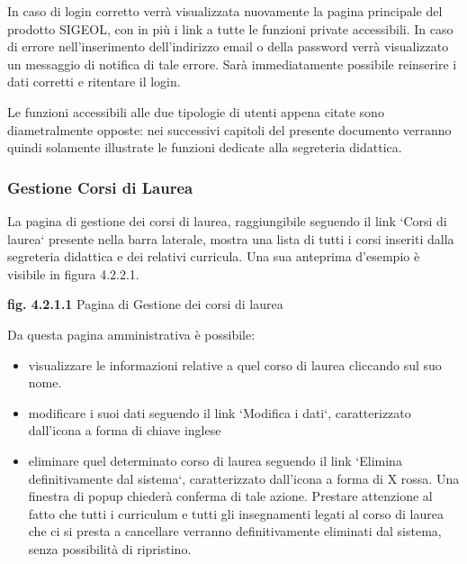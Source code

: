 \documentclass[11pt,a4paper]{article}
\begin{document}
In caso di login corretto verrà visualizzata nuovamente la pagina principale del prodotto SIGEOL, con in più i link a tutte le funzioni private accessibili.
In caso di errore nell'inserimento dell'indirizzo email o della password verrà visualizzato un messaggio di notifica di tale errore.
Sarà immediatamente possibile reinserire i dati corretti e ritentare il login.

Le funzioni accessibili alle due tipologie di utenti appena citate sono diametralmente opposte: nei successivi capitoli del presente documento verranno quindi solamente illustrate le funzioni dedicate alla segreteria didattica.
\subsubsection{Gestione Corsi di Laurea}
La pagina di gestione dei corsi di laurea, raggiungibile seguendo il link `Corsi di laurea` presente nella barra laterale, mostra una lista di tutti i corsi inseriti dalla segreteria didattica e dei relativi curricula. Una sua anteprima d'esempio è visibile in figura 4.2.2.1.

\bigskip
\begin{center}
	\textbf{fig. 4.2.1.1} Pagina di Gestione dei corsi di laurea\\
\end{center}
\bigskip

Da questa pagina amministrativa è possibile:
\begin{itemize}
 \item visualizzare le informazioni relative a quel corso di laurea cliccando sul suo nome.
 \item modificare i suoi dati seguendo il link `Modifica i dati`, caratterizzato dall'icona a forma di chiave inglese
 \item eliminare quel determinato corso di laurea seguendo il link `Elimina definitivamente dal sistema`, caratterizzato dall'icona a forma di X rossa. Una finestra di popup chiederà conferma di tale azione. Prestare attenzione al fatto che tutti i curriculum e tutti gli insegnamenti legati al corso di laurea che ci si presta a cancellare verranno definitivamente eliminati dal sistema, senza possibilità di ripristino.
\end{itemize}
\end{document}
